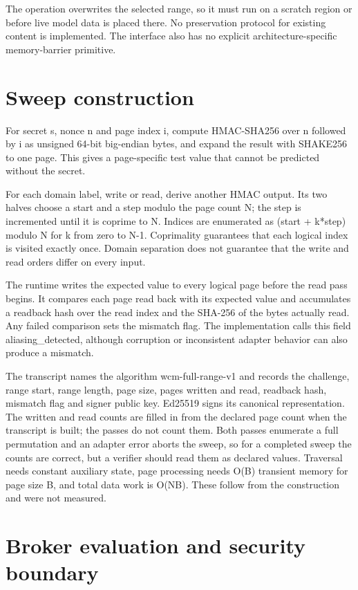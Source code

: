 \documentclass[10pt,letterpaper]{article}
\let\plainsection\section
\renewcommand{\section}{\Needspace{6\baselineskip}\plainsection}
\begin{document}
The operation overwrites the selected range, so it must run on a scratch region or before live model data is placed there. No preservation protocol for existing content is implemented. The interface also has no explicit architecture-specific memory-barrier primitive.


\section{Sweep construction}

For secret s, nonce n and page index i, compute HMAC-SHA256 over n followed by i as unsigned 64-bit big-endian bytes, and expand the result with SHAKE256 to one page. This gives a page-specific test value that cannot be predicted without the secret.


For each domain label, write or read, derive another HMAC output. Its two halves choose a start and a step modulo the page count N; the step is incremented until it is coprime to N. Indices are enumerated as (start + k*step) modulo N for k from zero to N-1. Coprimality guarantees that each logical index is visited exactly once. Domain separation does not guarantee that the write and read orders differ on every input.


The runtime writes the expected value to every logical page before the read pass begins. It compares each page read back with its expected value and accumulates a readback hash over the read index and the SHA-256 of the bytes actually read. Any failed comparison sets the mismatch flag. The implementation calls this field aliasing\_detected, although corruption or inconsistent adapter behavior can also produce a mismatch.


The transcript names the algorithm wcm-full-range-v1 and records the challenge, range start, range length, page size, pages written and read, readback hash, mismatch flag and signer public key. Ed25519 signs its canonical representation. The written and read counts are filled in from the declared page count when the transcript is built; the passes do not count them. Both passes enumerate a full permutation and an adapter error aborts the sweep, so for a completed sweep the counts are correct, but a verifier should read them as declared values. Traversal needs constant auxiliary state, page processing needs O(B) transient memory for page size B, and total data work is O(NB). These follow from the construction and were not measured.


\section{Broker evaluation and security boundary}
\end{document}

